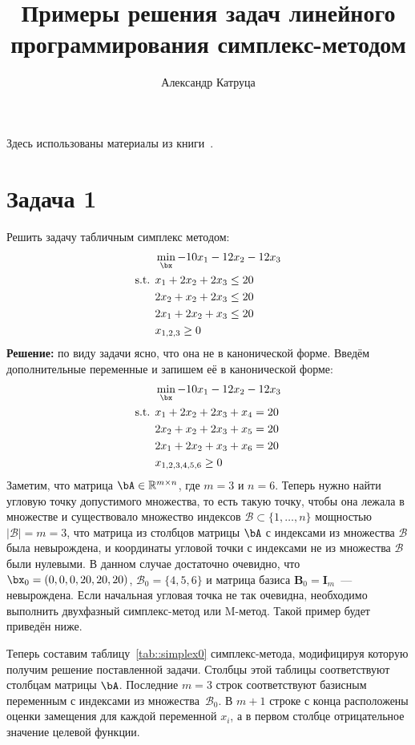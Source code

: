 \documentclass[12pt]{article}
\title{Примеры решения задач линейного программирования симплекс-методом}
\author{Александр Катруца}
\date{}
\begin{document}
\maketitle
Здесь использованы материалы из книги~\cite{intro2lin}. 
\section{Задача 1}
Решить задачу табличным симплекс методом:
\begin{equation*}
\begin{split}
& \min_{\bx} -10x_1 - 12x_2 - 12x_3\\
\text{s.t. } & x_1 + 2x_2 +2x_3 \leq 20\\
& 2x_2 + x_2 + 2x_3 \leq 20\\
& 2x_1 + 2x_2 + x_3 \leq 20\\
& x_{1,2,3} \geq 0
\end{split}
\end{equation*}
\textbf{Решение:} по виду задачи ясно, что она не в канонической  форме. Введём дополнительные переменные и запишем её в канонической форме:
\begin{equation*}
\begin{split}
& \min_{\bx} -10x_1 - 12x_2 - 12x_3\\
\text{s.t. } & x_1 + 2x_2 +2x_3 + x_4 = 20\\
& 2x_2 + x_2 + 2x_3 + x_5 = 20\\
& 2x_1 + 2x_2 + x_3 + x_6 = 20\\
& x_{1,2,3,4,5,6} \geq 0
\end{split}
\end{equation*}
Заметим, что матрица $\bA \in \mathbb{R}^{m \times n}$, где $m=3$ и $n=6$.
Теперь нужно найти угловую точку допустимого множества, то есть такую точку, чтобы она лежала в множестве и существовало множество индексов $\mathcal{B} \subset \{1, \dots, n\}$ мощностью $|\mathcal{B}| = m = 3$, что матрица из столбцов матрицы $\bA$ с индексами из множества $\mathcal{B}$ была невырождена, и координаты угловой точки с индексами не из множества $\mathcal{B}$ были нулевыми.
В данном случае достаточно очевидно, что $\bx_0 = (0, 0, 0, 20, 20, 20)$, $\mathcal{B}_0 = \{4, 5, 6 \}$ и матрица базиса $\mathbf{B}_0 = \mathbf{I}_m$~--- невырождена.
Если начальная угловая точка не так очевидна, необходимо выполнить двухфазный симплекс-метод или M-метод. 
Такой пример будет приведён ниже.

Теперь составим таблицу~\ref{tab::simplex0} симплекс-метода, модифицируя которую получим решение поставленной задачи.
Столбцы этой таблицы соответствуют столбцам матрицы $\bA$. 
Последние $m=3$ строк соответствуют базисным переменным с индексами из множества~$\mathcal{B}_0$.
В $m+1$ строке с конца расположены оценки замещения для каждой переменной $x_i$, а в первом столбце отрицательное значение целевой функции.
\end{document}
